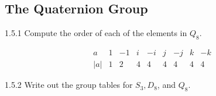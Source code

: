 \subsection{The Quaternion Group}

\begin{exercise}{1.5.1}
    Compute the order of each of the elements in $Q_8$.
\end{exercise}

\begin{sol}
    \[
    	\begin{array}{c|c|c|c|c|c|c|c|c}
            a & 1 & -1 & i & -i & j & -j & k & -k \\
            \hline
            |a| & 1 & 2 & 4 & 4 & 4 & 4 & 4 & 4
        \end{array}
	\]
\end{sol}

\begin{exercise}{1.5.2}
    Write out the group tables for $S_3, D_8$, and $Q_8$.

\end{exercise}

